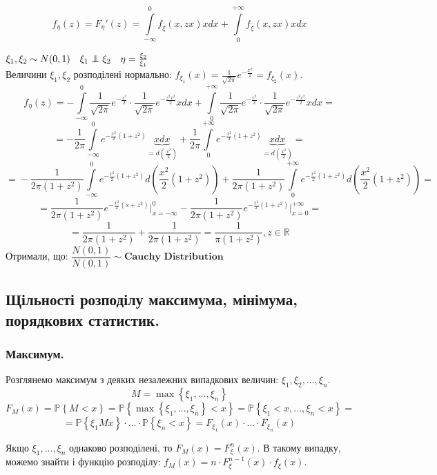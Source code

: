 $$
f_{\eta}(z) = F_{\eta}'(z) =  \int\limits_{-\infty}^{ 0}{ f_{\overline{\xi}}(x,zx)x dx} +  \int\limits_{0}^{ +\infty}{f_{\overline{\xi}}(x, zx) x dx}
$$
\begin{example}
    $\xi_1, \xi_2 \sim N(0,1) \quad \xi_1 \independent \xi_2 \quad \eta = \frac{\xi_2}{\xi_1} $
\\ Величини $\xi_1, \xi_2$ розподілені нормально: $
f_{\xi_1} (x) = \frac{1}{\sqrt{2 \pi}} e^{ - \frac{x^2}{2} }  = f_{\xi_2 } (x).
$
$$
f_{\eta} (z) = -  \int\limits_{-\infty}^{ 0}{\frac{1}{\sqrt{2 \pi}} e^{ - \frac{x^2}{2} } \cdot \frac{1}{\sqrt{2 \pi}} e^{ - \frac{z^2x^2}{2} } } x dx + \int\limits_{0}^{ +\infty}{\frac{1}{\sqrt{2 \pi}} e^{ - \frac{x^2}{2} } \cdot \frac{1}{\sqrt{2 \pi}} e^{ - \frac{z^2x^2}{2} } } x dx  =
$$
$$
= - \frac{1}{2\pi}  \int\limits_{-\infty}^{0}{ e^{ -\frac{x^2}{2}(1+z^2) }} \underbrace{xdx}_{= d \left( \frac{x^2}{2}  \right)}  + \frac{1}{2\pi}  \int\limits_{0}^{+ \infty}{ e^{ -\frac{x^2}{2}(1+z^2) }} \underbrace{xdx}_{= d \left( \frac{x^2}{2}  \right)} =
$$
$$
=\! - \frac{1 }{2 \pi ( 1 \!+\! z^2)}  \!\int\limits_{-\infty}^{0}{ e^{- \frac{x^2}{2}(1+z^2) } d \left( \frac{x^2}{2}(1\!+\!z^2) \right) }  \!+ \frac{1 }{2 \pi ( 1 \!+\! z^2)}  \!\int\limits_{0}^{+ \infty}{ e^{- \frac{x^2}{2}(1+z^2) } d\! \left( \frac{x^2}{2}(1\!+\!z^2) \right) } \!=
$$
$$
= \frac{1 }{2 \pi ( 1 + z^2)}   e^{- \frac{x^2}{2}(s+z^2) } \Bigg|_{x = -\infty}^{0}  - \frac{1 }{2 \pi ( 1 + z^2)}   e^{- \frac{x^2}{2}(1+z^2) } \Bigg|_{x = 0}^{+\infty} =
$$
$$
 =\frac{1}{2\pi (1+ z^2)} +  \frac{1}{2\pi (1+ z^2)} = \frac{1}{\pi (1+ z^2)} , z \in \mathbb{R}
$$
Отримали, що: $ \dfrac{N(0,1)}{N(0,1)} \sim \textbf{Cauchy Distribution} $
\end{example}

\subsection{Щільності розподілу максимума, мінімума, порядкових статистик.}
\subsubsection{Максимум.}
Розглянемо максимум з деяких незалежних випадкових величин: $ \xi_1 , \xi_2, ... , \xi_n$.
$$M = \max \left\lbrace \xi_1, ..., \xi_n \right\rbrace $$
$$
F_M (x) =  \mathbb{P} \left\lbrace M < x \right\rbrace = \mathbb{P} \left\lbrace \max \left\lbrace \xi_1, ... , \xi_n \right\rbrace < x  \right\rbrace  = \mathbb{P} \left\lbrace \xi_1 < x, ... , \xi_n < x \right\rbrace =
$$
$$
= \mathbb{P} \left\lbrace \xi_1 M x \right\rbrace \cdot ... \cdot \mathbb{P} \left\lbrace  \xi_n < x \right\rbrace = F_{\xi_1} (x ) \cdot ... \cdot F_{\xi_n} (x)
$$
\begin{center}
\end{center}
Якщо $\xi_1 , ..., \xi_n$ однаково розподілені, то $ F_M (x) = F^n_{\xi} (x)$. В такому випадку, можемо знайти і функцію розподілу: $ f_M (x) = n \cdot F_{\xi}^{n-1} (x) \cdot f_{\xi }(x)$.
